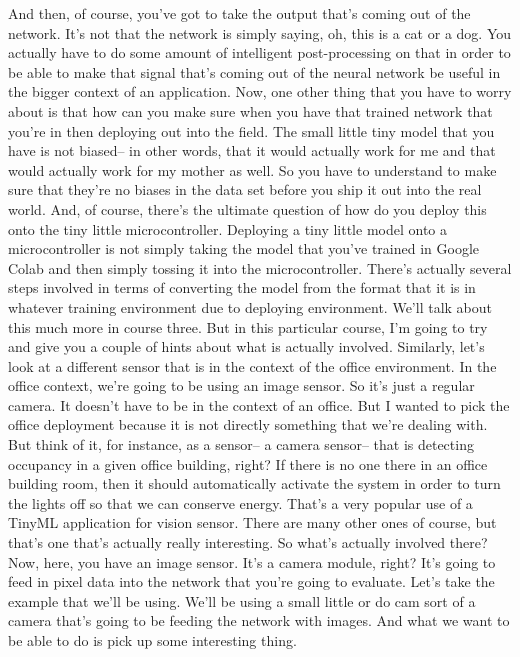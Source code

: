 And then, of course, you've got to take the output that's
coming out of the network.
It's not that the network is simply saying, oh, this is a cat or a dog.
You actually have to do some amount of intelligent post-processing
on that in order to be able to make that signal that's
coming out of the neural network be useful in the bigger
context of an application.
Now, one other thing that you have to worry about is that how can
you make sure when you have that trained network
that you're in then deploying out into the field.
The small little tiny model that you have is not biased--
in other words, that it would actually work for me
and that would actually work for my mother as well.
So you have to understand to make sure that they're
no biases in the data set before you ship it out into the real world.
And, of course, there's the ultimate question
of how do you deploy this onto the tiny little microcontroller.
Deploying a tiny little model onto a microcontroller
is not simply taking the model that you've trained in Google Colab
and then simply tossing it into the microcontroller.
There's actually several steps involved in terms
of converting the model from the format that it
is in whatever training environment due to deploying environment.
We'll talk about this much more in course three.
But in this particular course, I'm going to try and give you a couple of hints
about what is actually involved.
Similarly, let's look at a different sensor
that is in the context of the office environment.
In the office context, we're going to be using an image sensor.
So it's just a regular camera.
It doesn't have to be in the context of an office.
But I wanted to pick the office deployment because it is not directly
something that we're dealing with.
But think of it, for instance, as a sensor--
a camera sensor-- that is detecting occupancy in a given office building,
right?
If there is no one there in an office building room,
then it should automatically activate the system
in order to turn the lights off so that we can conserve energy.
That's a very popular use of a TinyML application for vision sensor.
There are many other ones of course, but that's
one that's actually really interesting.
So what's actually involved there?
Now, here, you have an image sensor.
It's a camera module, right?
It's going to feed in pixel data into the network
that you're going to evaluate.
Let's take the example that we'll be using.
We'll be using a small little or do cam sort
of a camera that's going to be feeding the network with images.
And what we want to be able to do is pick up some interesting thing.
